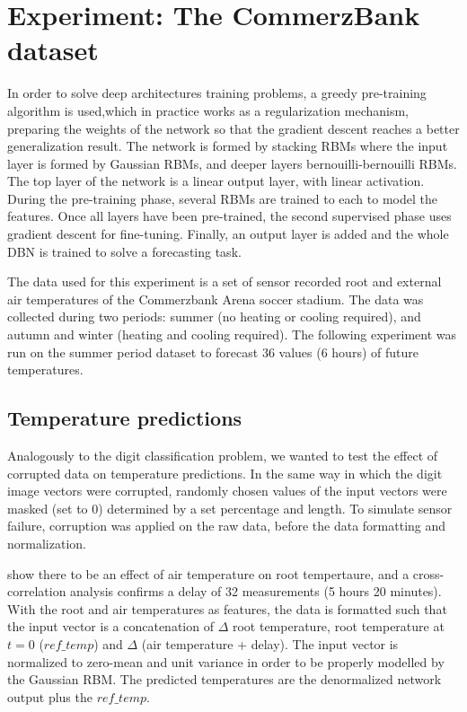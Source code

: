 \section{Experiment: The CommerzBank dataset}
In order to solve deep architectures training problems, a greedy pre-training algorithm is used,which in practice works as a regularization mechanism, preparing the weights of the network so that the gradient descent reaches a better generalization result.
The network is formed by stacking RBMs where the input layer is formed by Gaussian RBMs, and
deeper layers bernouilli-bernouilli RBMs. The top layer of the network is a linear output layer, with linear activation. During the pre-training phase, several RBMs are trained to each to model the features. Once all layers have been pre-trained, the second supervised phase uses gradient descent for fine-tuning. Finally, an output layer is added and the whole DBN is trained to solve a forecasting task.

The data used for this experiment is a set of sensor recorded root and external air temperatures of the Commerzbank Arena soccer stadium. The data was collected during two periods: summer (no heating or cooling required), and autumn and winter (heating and cooling required). The following experiment was run on the summer period dataset to forecast 36 values (6 hours) of future temperatures.


\subsection{Temperature predictions}
Analogously to the digit classification problem, we wanted to test the effect of corrupted data on temperature predictions. In the same way in which the digit image vectors were corrupted, randomly chosen values of the input vectors were masked (set to 0) determined by a set percentage and length. To simulate sensor failure, corruption was applied on the raw data, before the data formatting and normalization.

\cite{Schmidt} show there to be an effect of air temperature on root tempertaure, and a cross-correlation analysis confirms a delay of 32 measurements (5 hours 20 minutes). With the root and air temperatures as features, the data is formatted such that the input vector is a concatenation of $\Delta$ root temperature, root temperature at $t=0$ ($ref\_temp$) and $\Delta$ (air temperature + delay). The input vector is normalized to zero-mean and unit variance in order to be properly modelled by the Gaussian RBM. The predicted temperatures are the denormalized network output plus the $ref\_temp$.


